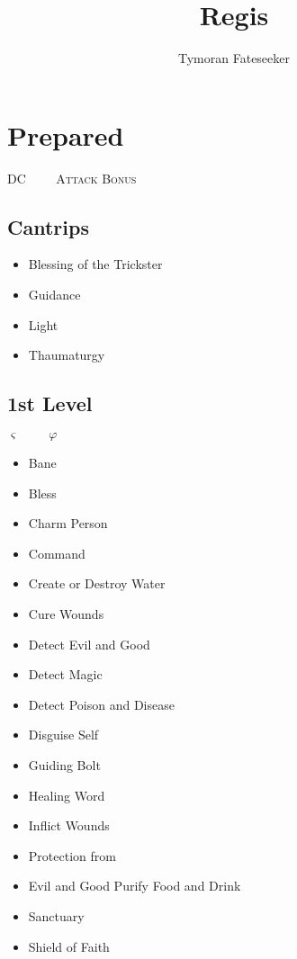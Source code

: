 \documentclass[10pt,twoside,twocolumn,openany]{book}
\newcommand{\tikzcircle}[2][black,fill=white]{\tikz[baseline=-0.5ex]\draw[#1,radius=#2] (0,0) circle ;}%
\begin{document}
\title{Regis}
\author{Tymoran Fateseeker}
\date{\vspace{-5ex}}
\maketitle

\dndtoc

\chapter{Prepared}
\renewcommand\labelitemi{\tikzcircle{4pt}}
\Large{\textsc{DC\underline{$\hspace{1cm}$}\hspace{1cm}Attack Bonus\underline{$\hspace{1cm}$}}}
\section{Cantrips}
\begin{itemize}
	\renewcommand\labelitemi{{\tikzcircle[fill=lightgray]{4pt}}}
	\item Blessing of the Trickster
	\item Guidance
	\item Light
	\item Thaumaturgy
\end{itemize}
\section{1st Level}
${\varsigma}\hspace{1cm}\varphi\hspace{1cm}$
\begin{itemize}
	\item Bane
	\item Bless
	\item[{\tikzcircle[fill=lightgray]{4pt}}] Charm Person
	\item Command
	\item Create or Destroy Water 
	\item Cure Wounds
	\item Detect Evil and Good 
	\item Detect Magic
	\item Detect Poison and Disease 
	\item[{\tikzcircle[fill=lightgray]{4pt}}] Disguise Self
	\item Guiding Bolt
	\item Healing Word
	\item Inflict Wounds
	\item Protection from
	\item Evil and Good Purify Food and Drink 
	\item Sanctuary
	\item Shield of Faith
\end{itemize}
\end{document}
